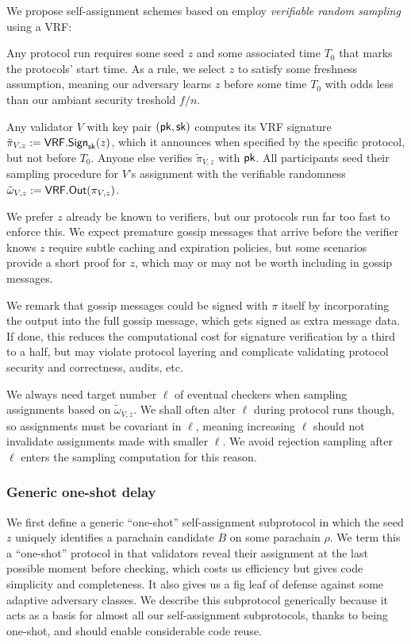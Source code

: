 We propose self-assignment schemes based on employ {\em verifiable random sampling} using a VRF:  

Any protocol run requires some seed $z$ and some associated time $T_0$ that marks the protocols' start time.  As a rule, we select $z$ to satisfy some freshness assumption, meaning our adversary learns $z$ before some time $T_0$ with odds less than our ambiant security treshold $f/n$.

Any validator $V$ with key pair $(\mathsf{pk},\mathsf{sk})$ computes its VRF signature $\tilde{\pi}_{V,z} := \mathsf{VRF}.\mathsf{Sign}_{\mathsf{sk}}(z)$, which it announces when specified by the specific protocol, but not before $T_0$.  Anyone else verifies $\tilde{\pi}_{V,z}$ with $\mathsf{pk}$.  All participants seed their sampling procedure for $V$'s assignment with the verifiable randomness $\tilde{\omega}_{V,z} := \mathsf{VRF}.\mathsf{Out}(\pi_{V,z})$.

We prefer $z$ already be known to verifiers, but our protocols run far too fast to enforce this.  We expect premature gossip messages that arrive before the verifier knows $z$ require subtle caching and expiration policies, but some scenarios provide a short proof for $z$, which may or may not be worth including in gossip messages.

We remark that gossip messages could be signed with $\pi$ itself by incorporating the output into the full gossip message, which gets signed as extra message data.  If done, this reduces the computational cost for signature verification by a third to a half, but may violate protocol layering and complicate validating protocol security and correctness, audits, etc. 

We always need target number $\ell$ of eventual checkers when sampling assignments based on $\tilde{\omega}_{V,z}$.  We shall often alter $\ell$ during protocol runs though, so assignments must be covariant in $\ell$, meaning increasing $\ell$ should not invalidate assignments made with smaller $\ell$.  We avoid rejection sampling after $\ell$ enters the sampling computation for this reason.

\subsubsection{Generic one-shot delay}

We first define a generic ``one-shot'' self-assignment subprotocol in which the seed $z$ uniquely identifies a parachain candidate $B$ on some parachain $\rho$.  We term this a ``one-shot'' protocol in that validators reveal their assignment at the last possible moment before checking, which costs us efficiency but gives code simplicity and completeness.  It also gives us a fig leaf of defense against some adaptive adversary classes.  We describe this subprotocol generically because it acts as a basis for almost all our self-assignment subprotocols, thanks to being one-shot, and should enable considerable code reuse.  

